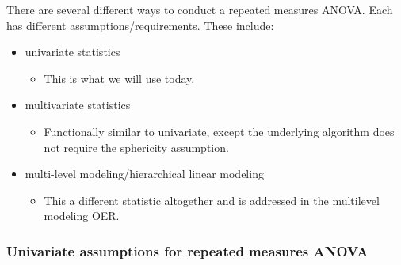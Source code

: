\documentclass[
  11pt,
]{book}
\providecommand{\tightlist}{%
  \setlength{\itemsep}{0pt}\setlength{\parskip}{0pt}}
\begin{document}
There are several different ways to conduct a repeated measures ANOVA. Each has different assumptions/requirements. These include:

\begin{itemize}
\tightlist
\item
  univariate statistics

  \begin{itemize}
  \tightlist
  \item
    This is what we will use today.
  \end{itemize}
\item
  multivariate statistics

  \begin{itemize}
  \tightlist
  \item
    Functionally similar to univariate, except the underlying algorithm does not require the sphericity assumption.
  \end{itemize}
\item
  multi-level modeling/hierarchical linear modeling

  \begin{itemize}
  \tightlist
  \item
    This a different statistic altogether and is addressed in the \href{https://lhbikos.github.io/MultilevelModeling}{multilevel modeling OER}.
  \end{itemize}
\end{itemize}

\hypertarget{univariate-assumptions-for-repeated-measures-anova}{%
\subsubsection{Univariate assumptions for repeated measures ANOVA}\label{univariate-assumptions-for-repeated-measures-anova}}
\end{document}
